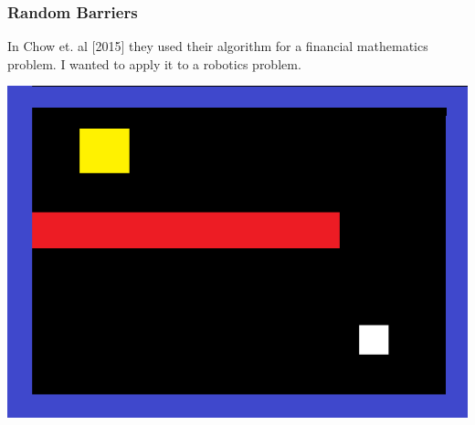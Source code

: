 \documentclass{beamer}
\begin{document}
\begin{frame}
	\frametitle{Random Barriers}
	In Chow et. al [2015] they used their algorithm for a financial mathematics problem. I wanted to apply it to a robotics problem.
	\begin{center}
	 \includegraphics[scale=.4]{Random_barrier}
	\end{center} 
\end{frame}
\end{document}
